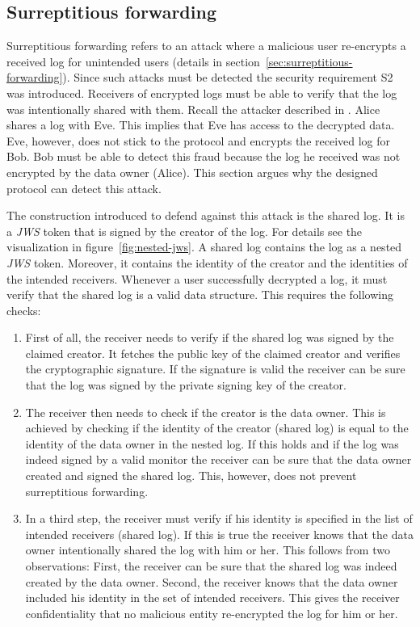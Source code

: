 \documentclass[../main.tex]{subfiles}
\begin{document}
\subsection{Surreptitious forwarding}
Surreptitious forwarding refers to an attack where a malicious user re-encrypts a received log for unintended users (details in section~\ref{sec:surreptitious-forwarding}).
Since such attacks must be detected the security requirement S2 was introduced.
Receivers of encrypted logs must be able to verify that the log was intentionally shared with them.
Recall the attacker described in .
Alice shares a log with Eve.
This implies that Eve has access to the decrypted data.
Eve, however, does not stick to the protocol and encrypts the received log for Bob.
Bob must be able to detect this fraud because the log he received was not encrypted by the data owner (Alice).
This section argues why the designed protocol can detect this attack.

The construction introduced to defend against this attack is the shared log.
It is a \emph{JWS} token that is signed by the creator of the log.
For details see the visualization in figure~\ref{fig:nested-jws}.
A shared log contains the log as a nested \emph{JWS} token.
Moreover, it contains the identity of the creator and the identities of the intended receivers.
Whenever a user successfully decrypted a log, it must verify that the shared log is a valid data structure.
This requires the following checks:
\begin{enumerate}
\item 
First of all, the receiver needs to verify if the shared log was signed by the claimed creator.
It fetches the public key of the claimed creator and verifies the cryptographic signature.
If the signature is valid the receiver can be sure that the log was signed by the private signing key of the creator.
\item 
The receiver then needs to check if the creator is the data owner. 
This is achieved by checking if the identity of the creator (shared log) is equal to the identity of the data owner in the nested log.
If this holds and if the log was indeed signed by a valid monitor the receiver can be sure that the data owner created and signed the shared log.
This, however, does not prevent surreptitious forwarding.
\item 
In a third step, the receiver must verify if his identity is specified in the list of intended receivers (shared log).
If this is true the receiver knows that the data owner intentionally shared the log with him or her.
This follows from two observations:
First, the receiver can be sure that the shared log was indeed created by the data owner.
Second, the receiver knows that the data owner included his identity in the set of intended receivers.
This gives the receiver confidentiality that no malicious entity re-encrypted the log for him or her.
\end{enumerate}
\end{document}
